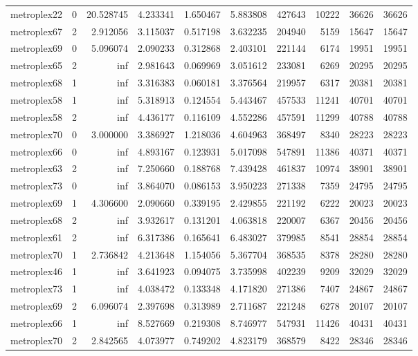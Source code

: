 \begin{longtable}{|l|r|r|r|r|r|r|r|r|r|}
metroplex22 & 0 & 20.528745 & 4.233341 & 1.650467 & 5.883808 & 427643 & 10222 & 36626 & 36626 \\
metroplex67 & 2 & 2.912056 & 3.115037 & 0.517198 & 3.632235 & 204940 & 5159 & 15647 & 15647 \\
metroplex69 & 0 & 5.096074 & 2.090233 & 0.312868 & 2.403101 & 221144 & 6174 & 19951 & 19951 \\
metroplex65 & 2 & inf & 2.981643 & 0.069969 & 3.051612 & 233081 & 6269 & 20295 & 20295 \\
metroplex68 & 1 & inf & 3.316383 & 0.060181 & 3.376564 & 219957 & 6317 & 20381 & 20381 \\
metroplex58 & 1 & inf & 5.318913 & 0.124554 & 5.443467 & 457533 & 11241 & 40701 & 40701 \\
metroplex58 & 2 & inf & 4.436177 & 0.116109 & 4.552286 & 457591 & 11299 & 40788 & 40788 \\
metroplex70 & 0 & 3.000000 & 3.386927 & 1.218036 & 4.604963 & 368497 & 8340 & 28223 & 28223 \\
metroplex66 & 0 & inf & 4.893167 & 0.123931 & 5.017098 & 547891 & 11386 & 40371 & 40371 \\
metroplex63 & 2 & inf & 7.250660 & 0.188768 & 7.439428 & 461837 & 10974 & 38901 & 38901 \\
metroplex73 & 0 & inf & 3.864070 & 0.086153 & 3.950223 & 271338 & 7359 & 24795 & 24795 \\
metroplex69 & 1 & 4.306600 & 2.090660 & 0.339195 & 2.429855 & 221192 & 6222 & 20023 & 20023 \\
metroplex68 & 2 & inf & 3.932617 & 0.131201 & 4.063818 & 220007 & 6367 & 20456 & 20456 \\
metroplex61 & 2 & inf & 6.317386 & 0.165641 & 6.483027 & 379985 & 8541 & 28854 & 28854 \\
metroplex70 & 1 & 2.736842 & 4.213648 & 1.154056 & 5.367704 & 368535 & 8378 & 28280 & 28280 \\
metroplex46 & 1 & inf & 3.641923 & 0.094075 & 3.735998 & 402239 & 9209 & 32029 & 32029 \\
metroplex73 & 1 & inf & 4.038472 & 0.133348 & 4.171820 & 271386 & 7407 & 24867 & 24867 \\
metroplex69 & 2 & 6.096074 & 2.397698 & 0.313989 & 2.711687 & 221248 & 6278 & 20107 & 20107 \\
metroplex66 & 1 & inf & 8.527669 & 0.219308 & 8.746977 & 547931 & 11426 & 40431 & 40431 \\
metroplex70 & 2 & 2.842565 & 4.073977 & 0.749202 & 4.823179 & 368579 & 8422 & 28346 & 28346 \\

\end{longtable}
